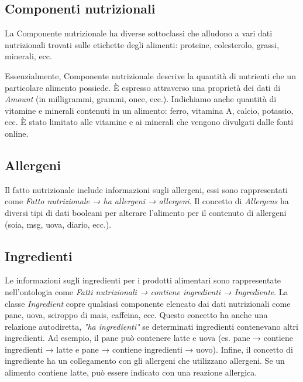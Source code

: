 \subsection{Componenti nutrizionali}
La Componente nutrizionale ha diverse sottoclassi che alludono a vari dati nutrizionali trovati sulle etichette degli alimenti: proteine, colesterolo, grassi, minerali, ecc. 

Essenzialmente, Componente nutrizionale descrive la quantità di nutrienti che un particolare alimento possiede. È espresso attraverso una proprietà dei dati di \emph{Amount} (in milligrammi, grammi, once, ecc.). 
Indichiamo anche quantità di vitamine e minerali contenuti in un alimento: ferro, vitamina A, calcio, potassio, ecc. È stato limitato alle vitamine e ai minerali che vengono divulgati dalle fonti online.

\subsection{Allergeni}
Il fatto nutrizionale include informazioni sugli allergeni, essi sono rappresentati come \emph{Fatto nutrizionale → ha allergeni → allergeni}. Il concetto di \emph{Allergens} ha diversi tipi di dati booleani per alterare l'alimento per il contenuto di allergeni (soia, msg, uova, diario, ecc.).

\subsection{Ingredienti}
Le informazioni sugli ingredienti per i prodotti alimentari sono rappresentate nell'ontologia come \emph{Fatti nutrizionali → contiene ingredienti → Ingrediente}. La classe \emph{Ingredient} copre qualsiasi componente elencato dai dati nutrizionali come pane, uova, sciroppo di mais, caffeina, ecc. 
Questo concetto ha anche una relazione autodiretta, \emph{"ha ingredienti"} se determinati ingredienti contenevano altri ingredienti. Ad esempio, il pane può contenere latte e uova (es. pane → contiene ingredienti → latte e pane → contiene ingredienti → uovo). 
Infine, il concetto di ingrediente ha un collegamento con gli allergeni che utilizzano allergeni. Se un alimento contiene latte, può essere indicato con una reazione allergica.

